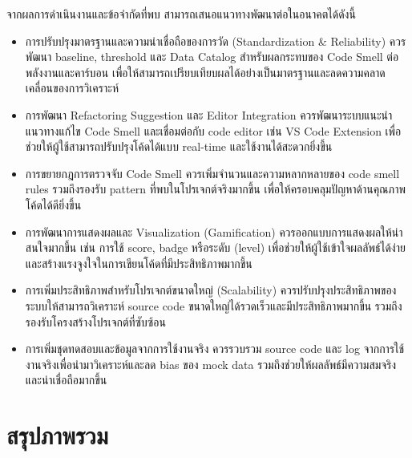 จากผลการดำเนินงานและข้อจำกัดที่พบ สามารถเสนอแนวทางพัฒนาต่อในอนาคตได้ดังนี้

\begin{itemize}
    \item {\boldfont การปรับปรุงมาตรฐานและความน่าเชื่อถือของการวัด (Standardization \& Reliability)}
    ควรพัฒนา {\italicfont baseline}, {\italicfont threshold} และ {\italicfont Data Catalog} สำหรับผลกระทบของ Code Smell ต่อพลังงานและคาร์บอน เพื่อให้สามารถเปรียบเทียบผลได้อย่างเป็นมาตรฐานและลดความคลาดเคลื่อนของการวิเคราะห์

    \item {\boldfont การพัฒนา Refactoring Suggestion และ Editor Integration}
    ควรพัฒนาระบบแนะนำแนวทางแก้ไข Code Smell และเชื่อมต่อกับ {\italicfont code editor} เช่น VS Code Extension เพื่อช่วยให้ผู้ใช้สามารถปรับปรุงโค้ดได้แบบ {\italicfont real-time} และใช้งานได้สะดวกยิ่งขึ้น

    \item {\boldfont การขยายกฎการตรวจจับ Code Smell}
    ควรเพิ่มจำนวนและความหลากหลายของ {\italicfont code smell rules} รวมถึงรองรับ {\italicfont pattern} ที่พบในโปรเจกต์จริงมากขึ้น เพื่อให้ครอบคลุมปัญหาด้านคุณภาพโค้ดได้ดียิ่งขึ้น

    \item {\boldfont การพัฒนาการแสดงผลและ Visualization (Gamification)}
    ควรออกแบบการแสดงผลให้น่าสนใจมากขึ้น เช่น การใช้ {\italicfont score}, {\italicfont badge} หรือระดับ ({\italicfont level}) เพื่อช่วยให้ผู้ใช้เข้าใจผลลัพธ์ได้ง่ายและสร้างแรงจูงใจในการเขียนโค้ดที่มีประสิทธิภาพมากขึ้น

    \item {\boldfont การเพิ่มประสิทธิภาพสำหรับโปรเจกต์ขนาดใหญ่ (Scalability)}
    ควรปรับปรุงประสิทธิภาพของระบบให้สามารถวิเคราะห์ {\italicfont source code} ขนาดใหญ่ได้รวดเร็วและมีประสิทธิภาพมากขึ้น รวมถึงรองรับโครงสร้างโปรเจกต์ที่ซับซ้อน

    \item {\boldfont การเพิ่มชุดทดสอบและข้อมูลจากการใช้งานจริง}
    ควรรวบรวม {\italicfont source code} และ {\italicfont log} จากการใช้งานจริงเพื่อนำมาวิเคราะห์และลด {\italicfont bias} ของ {\italicfont mock data} รวมถึงช่วยให้ผลลัพธ์มีความสมจริงและน่าเชื่อถือมากขึ้น
\end{itemize}


\section{สรุปภาพรวม}

